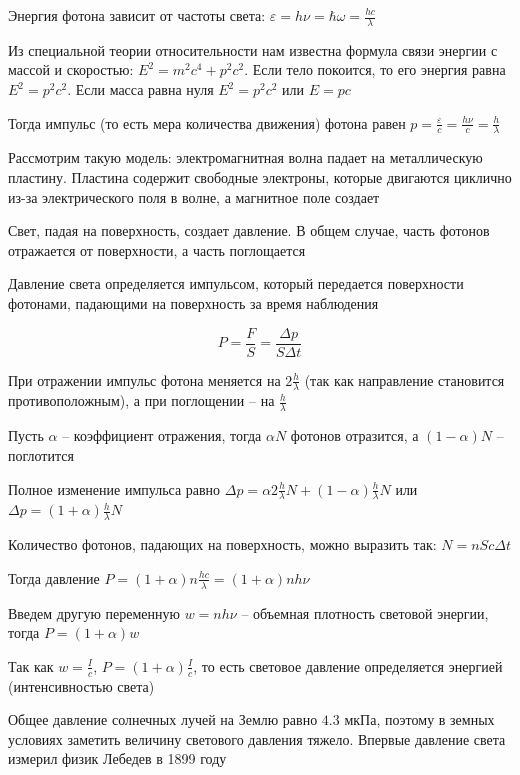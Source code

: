 \documentclass[12pt]{article}
\begin{document}
Энергия фотона зависит от частоты света: $\varepsilon = h \nu = \hbar \omega = \frac{h c}{\lambda}$

Из специальной теории относительности нам известна формула связи энергии с массой и скоростью: $E^2 = m^2 c^4 + p^2 c^2$. Если тело покоится, то его энергия равна $E^2 = p^2 c^2$. Если масса равна нуля $E^2 = p^2 c^2$ или $E = p c$

Тогда импульс (то есть мера количества движения) фотона равен $p = \frac{\varepsilon}{c} = \frac{h \nu}{c} = \frac{h}{\lambda}$

Рассмотрим такую модель: электромагнитная волна падает на металлическую пластину. Пластина содержит свободные электроны, которые двигаются циклично из-за электрического поля в волне, а магнитное поле создает 

Свет, падая на поверхность, создает давление. В общем случае, часть фотонов отражается от поверхности, а часть поглощается

Давление света определяется импульсом, который передается поверхности фотонами, падающими на поверхность за время наблюдения

\[P = \frac{F}{S} = \frac{\Delta p}{S \Delta t}\]

При отражении импульс фотона меняется на $2 \frac{h}{\lambda}$ (так как направление становится противоположным), а при поглощении -- на $\frac{h}{\lambda}$

Пусть $\alpha$ -- коэффициент отражения, тогда $\alpha N$ фотонов отразится, а $(1 - \alpha) N$ -- поглотится

Полное изменение импульса равно $\Delta p = \alpha 2\frac{h}{\lambda} N + (1 - \alpha) \frac{h}{\lambda} N$ или $\Delta p = (1 + \alpha) \frac{h}{\lambda} N$

Количество фотонов, падающих на поверхность, можно выразить так: $N = n S c \Delta t$

Тогда давление $P = (1 + \alpha) n \frac{h c}{\lambda} = (1 + \alpha) n h \nu$

Введем другую переменную $w = n h \nu$ -- объемная плотность световой энергии, тогда $P = (1 + \alpha) w$

Так как $w = \frac{I}{c}$, $P = (1 + \alpha) \frac{I}{c}$, то есть световое давление определяется энергией (интенсивностью света)

Общее давление солнечных лучей на Землю равно $4.3$ мкПа, поэтому в земных условиях заметить величину светового давления тяжело. Впервые давление света измерил физик Лебедев в 1899 году

\mediumvspace
\end{document}
